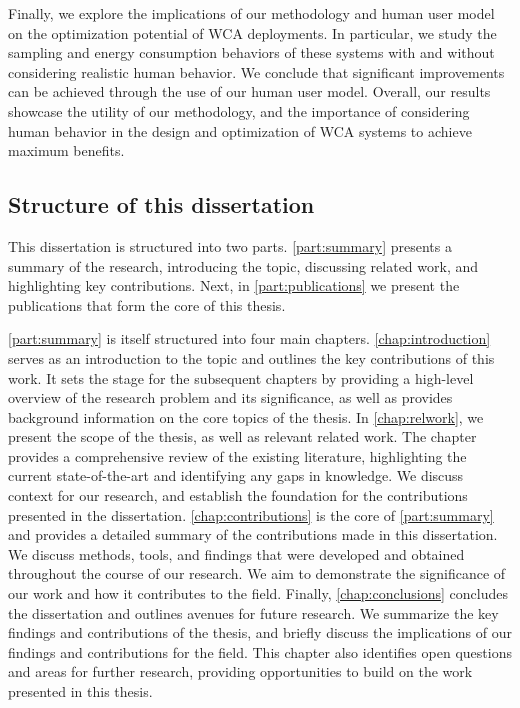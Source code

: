 Finally, we explore the implications of our methodology and human user model on the optimization potential of \gls{WCA} deployments.
In particular, we study the sampling and energy consumption behaviors of these systems with and without considering realistic human behavior.
We conclude that significant improvements can be achieved through the use of our human user model.
Overall, our results showcase the utility of our methodology, and the importance of considering human behavior in the design and optimization of \gls{WCA} systems to achieve maximum benefits.

\subsection{Structure of this dissertation}

This dissertation is structured into two parts.
\cref{part:summary} presents a summary of the research, introducing the topic, discussing related work, and highlighting key contributions.
Next, in \cref{part:publications} we present the publications that form the core of this thesis.

\cref{part:summary} is itself structured into four main chapters.
\cref{chap:introduction} serves as an introduction to the topic and outlines the key contributions of this work.
It sets the stage for the subsequent chapters by providing a high-level overview of the research problem and its significance, as well as provides background information on the core topics of the thesis.
In \cref{chap:relwork}, we present the scope of the thesis, as well as relevant related work.
The chapter provides a comprehensive review of the existing literature, highlighting the current state-of-the-art and identifying any gaps in knowledge.
We discuss context for our research, and establish the foundation for the contributions presented in the dissertation.
\cref{chap:contributions} is the core of \cref{part:summary} and provides a detailed summary of the contributions made in this dissertation.
We discuss methods, tools, and findings that were developed and obtained throughout the course of our research.
We aim to demonstrate the significance of our work and how it contributes to the field.
Finally, \cref{chap:conclusions} concludes the dissertation and outlines avenues for future research.
We summarize the key findings and contributions of the thesis, and briefly discuss the implications of our findings and contributions for the field.
This chapter also identifies open questions and areas for further research, providing opportunities to build on the work presented in this thesis.
